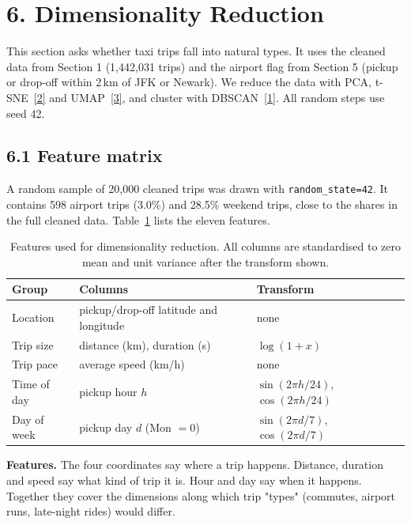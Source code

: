 \documentclass{article}
\begin{document}
\maketitle

\section*{6. Dimensionality Reduction}
\label{sec:q6}

This section asks whether taxi trips fall into natural types. It uses the cleaned data from Section 1 (1{,}442{,}031 trips) and the airport flag from Section 5 (pickup or drop-off within 2\,km of JFK or Newark). We reduce the data with PCA, t-SNE~\hyperref[ref:2]{[2]} and UMAP~\hyperref[ref:3]{[3]}, and cluster with DBSCAN~\hyperref[ref:1]{[1]}. All random steps use seed 42.

\subsection*{6.1 Feature matrix}

A random sample of 20{,}000 cleaned trips was drawn with \texttt{random\_state=42}. It contains 598 airport trips (3.0\%) and 28.5\% weekend trips, close to the shares in the full cleaned data. Table~\ref{tab:q6_features} lists the eleven features.

\begin{table}[!htbp]
  \caption{Features used for dimensionality reduction. All columns are standardised to zero mean and unit variance after the transform shown.}
  \label{tab:q6_features}
  \centering
  \small
  \begin{tabular}{lll}
    \toprule
    Group & Columns & Transform \\
    \midrule
    Location & pickup/drop-off latitude and longitude & none \\
    Trip size & distance (km), duration (s) & $\log(1+x)$ \\
    Trip pace & average speed (km/h) & none \\
    Time of day & pickup hour $h$ & $\sin(2\pi h/24)$, $\cos(2\pi h/24)$ \\
    Day of week & pickup day $d$ (Mon $=0$) & $\sin(2\pi d/7)$, $\cos(2\pi d/7)$ \\
    \bottomrule
  \end{tabular}
\end{table}

\textbf{Features.} The four coordinates say where a trip happens. Distance, duration and speed say what kind of trip it is. Hour and day say when it happens. Together they cover the dimensions along which trip "types" (commutes, airport runs, late-night rides) would differ.
\end{document}
